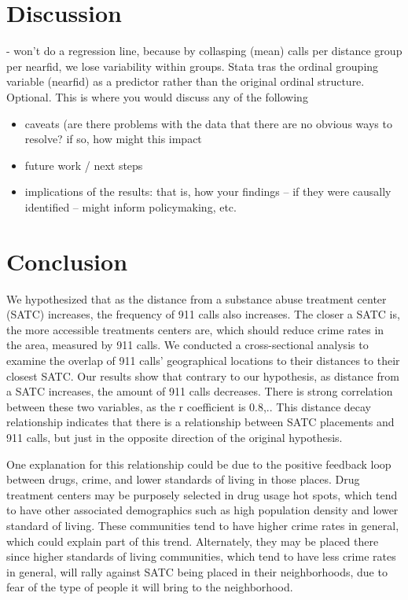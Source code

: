 \documentclass[12pt]{article}
\begin{document}


\section{Discussion}
\label{sec:discussion}
- won't do a regression line, because by collasping (mean) calls per distance group per nearfid, we lose variability within groups. Stata tras the ordinal grouping variable (nearfid) as a predictor rather than the original ordinal structure. 
Optional. This is where you would discuss any of the following
\begin{itemize}
    \item caveats (are there problems with the data that there are no obvious ways to resolve? if so, how might this impact
    \item future work / next steps
    \item     implications of the results: that is, how your findings -- if they were causally identified -- might inform policymaking, etc.
    \end{itemize}
\section{Conclusion}
\label{sec:conclusion}

    We hypothesized that as the distance from a substance abuse treatment center (SATC) increases, the frequency of 911 calls also increases. The closer a SATC is, the more accessible treatments centers are, which should reduce crime rates in the area, measured by 911 calls. We conducted a cross-sectional analysis to examine the overlap of 911 calls' geographical locations to their distances to their closest SATC. Our results show that contrary to our hypothesis, as distance from a SATC increases, the amount of 911 calls decreases. There is strong correlation between these two variables, as the r coefficient is 0.8,.. This distance decay relationship indicates that there is a relationship between SATC placements and 911 calls, but just in the opposite direction of the original hypothesis. 
    
    One explanation for this relationship could be due to the positive feedback loop between drugs, crime, and lower standards of living in those places. Drug treatment centers may be purposely selected in drug usage hot spots, which tend to have other associated demographics such as high population density and lower standard of living. These communities tend to have higher crime rates in general, which could explain part of this trend. Alternately, they may be placed there since higher standards of living communities, which tend to have less crime rates in general, will rally against SATC being placed in their neighborhoods, due to fear of the type of people it will bring to the neighborhood. 
    
\end{document}
